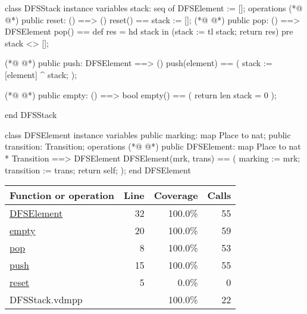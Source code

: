 \begin{vdmpp}
class DFSStack
  instance variables
    stack: seq of DFSElement := [];
  operations
(*@
\label{reset:5}
@*)
    public reset: () ==> ()
    reset() ==
      stack := [];
(*@
\label{pop:8}
@*)
    public pop: () ==> DFSElement
    pop() ==
      def res = hd stack in
      (stack := tl stack;
      return res)
    pre stack <> [];

(*@
\label{push:15}
@*)
    public push: DFSElement ==> ()
    push(element) == (
      stack := [element] ^ stack;
    );

(*@
\label{empty:20}
@*)
    public empty: () ==> bool
    empty() == (
      return len stack = 0
    );

end DFSStack

class DFSElement
  instance variables
    public marking: map Place to nat;
    public transition: Transition;
  operations
(*@
\label{DFSElement:32}
@*)
    public DFSElement: map Place to nat * Transition ==> DFSElement
    DFSElement(mrk, trans) == (
      marking := mrk;
      transition := trans;
      return self;
    );
end DFSElement
\end{vdmpp}
\bigskip
\begin{longtable}{|l|r|r|r|}
\hline
Function or operation & Line & Coverage & Calls \\
\hline
\hline
\hyperref[DFSElement:32]{DFSElement} & 32&100.0\% & 55 \\
\hline
\hyperref[empty:20]{empty} & 20&100.0\% & 59 \\
\hline
\hyperref[pop:8]{pop} & 8&100.0\% & 53 \\
\hline
\hyperref[push:15]{push} & 15&100.0\% & 55 \\
\hline
\hyperref[reset:5]{reset} & 5&0.0\% & 0 \\
\hline
\hline
DFSStack.vdmpp & & 100.0\% & 22 \\
\hline
\end{longtable}